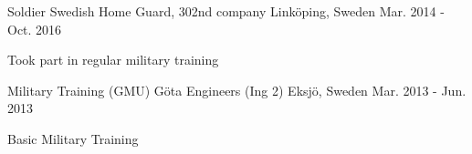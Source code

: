 \begin{cventries}

  \cventry
  {Soldier} %
  {Swedish Home Guard, 302nd company} %
  {Linköping, Sweden} %
  {Mar. 2014 - Oct. 2016} %
  {
    \begin{cvitems} %
      \item {Took part in regular military training}
    \end{cvitems}
  }


  \cventry
  {Military Training (GMU)} %
  {Göta Engineers (Ing 2)} %
  {Eksjö, Sweden} %
  {Mar. 2013 - Jun. 2013} %
  {
    \begin{cvitems} %
      \item {Basic Military Training}
    \end{cvitems}
  }

\end{cventries}
